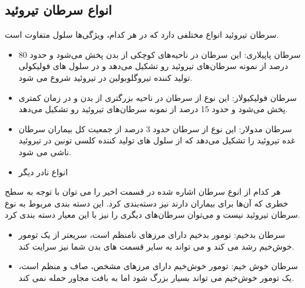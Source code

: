 \subsection{انواع سرطان تیروئید}\label{subsec:انواع-سرطان-تیروئید}

سرطان تیروئید انواع مختلفی دارد که در هر کدام، ویژگی‌ها سلول متفاوت است.

\begin{itemize}
    \item سرطان پاپیلاری:
    این سرطان در ناحیه‌های کوچکی از بدن پخش می‌شود و حدود 80 درصد از نمونه سرطان‌های تیروئید رو تشکیل می‌دهد و در سلول های فولیکولی تولید کننده تیروگلوبولین در تیروئید شروع می شود.
    \item سرطان فولیکیولار:
    این نوع از سرطان در ناحیه بزرگتری از بدن و در زمان کمتری پخش می‌شود و حدود 15 درصد از نمونه سرطان‌های تیروئید رو تشکیل می‌دهد.
    \item سرطان مدولار:
    این نوع از سرطان حدود 3 درصد از جمعیت کل بیماران سرطان غده تیروئید را تشکیل می‌دهد که از سلول های تولید کننده کلسی تونین در تیروئید ناشی می شود. 
    \item انواع نادر دیگر
\end{itemize}

هر کدام از انوع سرطان اشاره شده در قسمت اخیر را می توان با توجه به سطح خطری که آن‌ها برای بیماران دارند نیز دسته‌بندی کرد.
این دسته بندی مربوط به نوع سرطان تیروئید نیست و می‌توان سرطان‌های دیگری را نیز با این معیار دسته بندی کرد.
\begin{itemize}
    \item سرطان بدخیم:
    تومور بدخیم دارای مرزهای نامنظم است، سریعتر از یک تومور خوش‌خیم رشد می کند و می تواند به سایر قسمت های بدن شما نیز سرایت کند.
    \item سرطان خوش خیم:
    تومور خوش‌خیم دارای مرزهای مشخص، صاف و منظم است، یک تومور خوش‌خیم می تواند بسیار بزرگ شود اما به بافت مجاور حمله نمی کند.
\end{itemize}